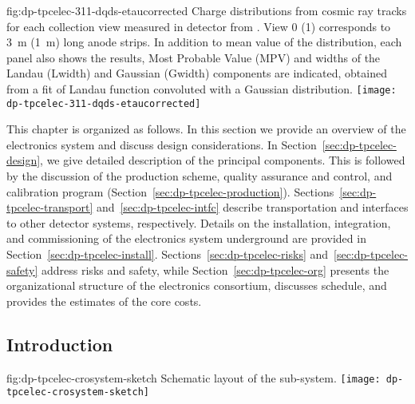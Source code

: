 \begin{dunefigure}{fig:dp-tpcelec-311-dqds-etaucorrected}
{Charge distributions from cosmic ray tracks for each collection view measured in  detector from \cite{Aimard:2018yxp}. View \num{0} (\num{1}) corresponds to \SI{3}{\meter} (\SI{1}{\meter}) long anode strips. In addition to mean value of the distribution, each panel also shows the results, Most Probable Value (MPV) and widths of the Landau (Lwidth) and Gaussian (Gwidth) components are indicated, obtained from a fit of Landau function convoluted with a Gaussian distribution.}
\texttt{[image: dp-tpcelec-311-dqds-etaucorrected]}
\end{dunefigure}

This chapter is organized as follows. In this section we provide an overview of the   electronics system and discuss design considerations. In Section~\ref{sec:dp-tpcelec-design}, we give detailed description of the principal components. This is followed by the discussion of the production scheme, quality assurance and control, and calibration program (Section~\ref{sec:dp-tpcelec-production}). Sections~\ref{sec:dp-tpcelec-transport} and~\ref{sec:dp-tpcelec-intfc} describe transportation and interfaces to other detector systems, respectively. Details on the installation, integration, and commissioning of the   electronics system underground are provided in Section~\ref{sec:dp-tpcelec-install}. Sections~\ref{sec:dp-tpcelec-risks} and~\ref{sec:dp-tpcelec-safety} address risks and safety, while Section~\ref{sec:dp-tpcelec-org} presents the organizational structure of the   electronics consortium, discusses schedule, and provides the estimates of the core costs. 


\subsection{Introduction}
\label{ssec:dp-tpcelec-intro}

\begin{dunefigure}{fig:dp-tpcelec-crosystem-sketch}
{Schematic layout of the   sub-system.}
\texttt{[image: dp-tpcelec-crosystem-sketch]}
\end{dunefigure}

